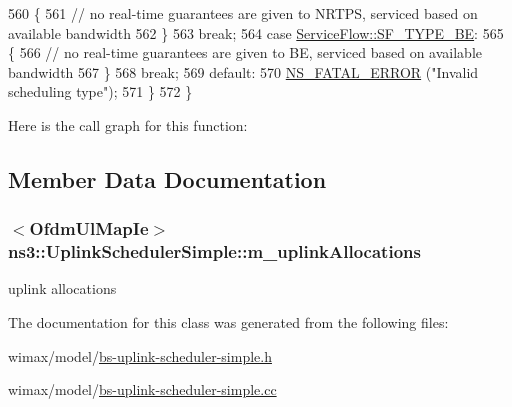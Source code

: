 \begin{DoxyCode}
560       \{
561         \textcolor{comment}{// no real-time guarantees are given to NRTPS, serviced based on available bandwidth}
562       \}
563       \textcolor{keywordflow}{break};
564     \textcolor{keywordflow}{case} \hyperlink{classns3_1_1ServiceFlow_a7990ba10be1e098328fd1e6382a26235af93a8bd8fce654e688f957f6f362e5c7}{ServiceFlow::SF\_TYPE\_BE}:
565       \{
566         \textcolor{comment}{// no real-time guarantees are given to BE, serviced based on available bandwidth}
567       \}
568       \textcolor{keywordflow}{break};
569     \textcolor{keywordflow}{default}:
570       \hyperlink{group__fatal_ga5131d5e3f75d7d4cbfd706ac456fdc85}{NS\_FATAL\_ERROR} (\textcolor{stringliteral}{"Invalid scheduling type"});
571     \}
572 \}
\end{DoxyCode}


Here is the call graph for this function\+:




\subsection{Member Data Documentation}
\subsubsection[{\texorpdfstring{m\+\_\+uplink\+Allocations}{m_uplinkAllocations}}]{$<${\bf Ofdm\+Ul\+Map\+Ie}$>$ ns3\+::\+Uplink\+Scheduler\+Simple\+::m\+\_\+uplink\+Allocations\hspace{0.3cm}{\ttfamily [private]}}\hypertarget{classns3_1_1UplinkSchedulerSimple_a81eb434b3223cb1a0641c5cd82b04009}{}\label{classns3_1_1UplinkSchedulerSimple_a81eb434b3223cb1a0641c5cd82b04009}


uplink allocations 



The documentation for this class was generated from the following files\+:\begin{DoxyCompactItemize}
\item 
wimax/model/\hyperlink{bs-uplink-scheduler-simple_8h}{bs-\/uplink-\/scheduler-\/simple.\+h}\item 
wimax/model/\hyperlink{bs-uplink-scheduler-simple_8cc}{bs-\/uplink-\/scheduler-\/simple.\+cc}\end{DoxyCompactItemize}
